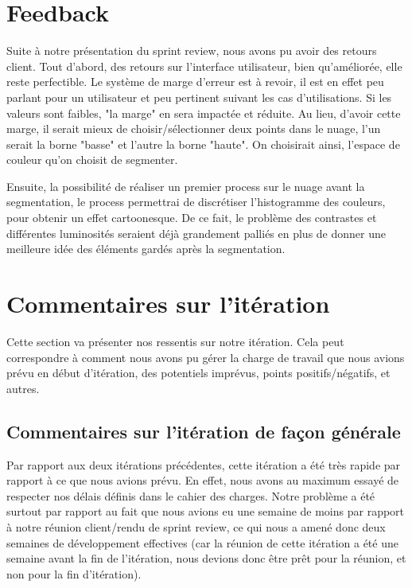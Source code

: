 \documentclass[12pt,titlepage,french]{article}
\begin{document}
\section{Feedback}

Suite à notre présentation du sprint review, nous avons pu avoir des retours client. Tout d'abord, des retours sur l'interface utilisateur, bien qu'améliorée, elle reste perfectible. Le système de marge d'erreur est à revoir, il est en effet peu parlant pour un utilisateur et peu pertinent suivant les cas d'utilisations. Si les valeurs sont faibles, "la marge" en sera impactée et réduite. Au lieu, d'avoir cette marge, il serait mieux de choisir/sélectionner deux points dans le nuage, l'un serait la borne "basse" et l'autre la borne "haute". On choisirait ainsi, l'espace de couleur qu'on choisit de segmenter.

Ensuite, la possibilité de réaliser un premier process sur le nuage avant la segmentation, le process permettrai de discrétiser l'histogramme des couleurs, pour obtenir un effet cartoonesque. De ce fait, le problème des contrastes et différentes luminosités seraient déjà grandement palliés en plus de donner une meilleure idée des éléments gardés après la segmentation.

\section{Commentaires sur l'itération}

Cette section va présenter nos ressentis sur notre itération. Cela peut correspondre à comment nous avons pu gérer la charge de travail que nous avions prévu en début d'itération, des potentiels imprévus, points positifs/négatifs, et autres.

\subsection{Commentaires sur l'itération de façon générale}

Par rapport aux deux itérations précédentes, cette itération a été très rapide par rapport à ce que nous avions prévu. En effet, nous avons au maximum essayé de respecter nos délais définis dans le cahier des charges. Notre problème a été surtout par rapport au fait que nous avions eu une semaine de moins par rapport à notre réunion client/rendu de sprint review, ce qui nous a amené donc deux semaines de développement effectives (car la réunion de cette itération a été une semaine avant la fin de l'itération, nous devions donc être prêt pour la réunion, et non pour la fin d'itération). \newline
\end{document}
